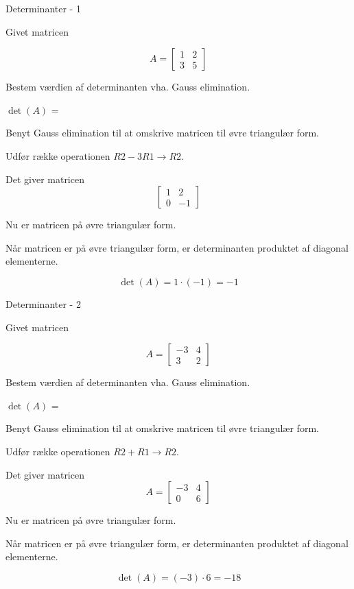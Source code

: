 \documentclass{article}
\begin{document}
\tableofcontents
\newpage

\begin{exercise}{Determinanter - 1}

Givet matricen

\[
A = \left[\begin{array}{rr}
1 & 2 \\ 
3 & 5 
\end{array} \right]
\]

Bestem værdien af determinanten vha. Gauss elimination.

$\det(A)$ = 

\hint
Benyt Gauss elimination til at omskrive matricen til 
øvre triangulær form.

\hint
Udfør række operationen
$R2 - 3R1 \to R2$.

\hint
Det giver matricen
\[
\left[\begin{array}{rr}
1 & 2 \\ 
0 & -1 
\end{array} \right]
\]

\hint
Nu er matricen på øvre triangulær form.

\hint
Når matricen er på øvre triangulær form, er determinanten 
produktet af diagonal elementerne.

\hint
\[
\det(A) = 1 \cdot (-1) = -1
\]


\end{exercise}


\begin{exercise}{Determinanter - 2}

Givet matricen

\[
A = \left[\begin{array}{rr}
-3 & 4 \\ 
3 & 2 
\end{array} \right]
\]

Bestem værdien af determinanten vha. Gauss elimination.

$\det(A)$ = 

\hint
Benyt Gauss elimination til at omskrive matricen til 
øvre triangulær form.

\hint
Udfør række operationen
$R2 + R1 \to R2$.

\hint
Det giver matricen
\[
A = \left[\begin{array}{rr}
-3 & 4 \\ 
0 & 6 
\end{array} \right]
\]

\hint
Nu er matricen på øvre triangulær form.

\hint
Når matricen er på øvre triangulær form, er determinanten 
produktet af diagonal elementerne.

\hint
\[
\det(A) = (-3) \cdot 6 = -18
\]


\end{exercise}
\end{document}

